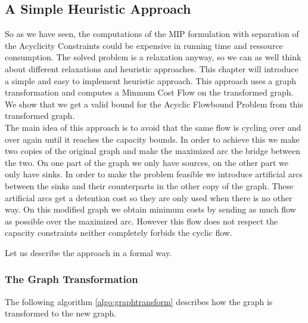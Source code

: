 \newpage
\subsection{A Simple Heuristic Approach}

So as we have seen, the computations of the MIP formulation with separation of the Acyclicity Constraints could be 
expensive in running time and ressource consumption. The solved problem is a relaxation anyway, so we can as well think 
about different relaxations and heuristic approaches. This chapter will introduce a simple and easy to 
implement heuristic approach. This approach uses a graph transformation and computes a Minmum Cost Flow on the 
transformed graph. We show that we get a valid bound for the Acyclic Flowbound Problem from this transformed graph.\\

The main idea of this approach is to avoid that the same flow is cycling over and over again until it reaches the 
capacity bounds. In order to achieve this we make two copies of the original graph and make the maximized arc the 
bridge between the two. On one part of the graph we only have sources, on the other part we only have sinks. 
In order to make the problem feasible we introduce artificial arcs between the sinks and their counterparts in the other 
copy of the graph. These artificial arcs get a detention cost so they are only used when there is no other way. On this 
modified graph we obtain minimum costs by sending as much flow as possible over the maximized arc. However this flow 
does not respect the capacity constraints neither completely forbids the cyclic flow. 

Let us describe the approach in a formal way.

\subsubsection*{The Graph Transformation}

The following algorithm \ref{algo:graphtransform} describes how the graph is transformed to the new graph.


